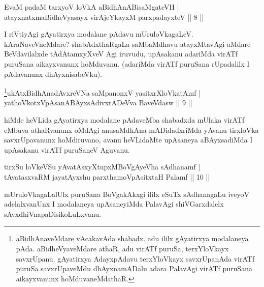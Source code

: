 \begin{shl}
EvaM padaM tarxyoV loVkA aBidhAnABisaMgateVH | \\
atayxnatxmaBidheVyasayx virAjeYkayxM parxpadayxteV \hfill ||  8 || 
\end{shl}

\begin{artha} 
I riVtiyAgi gAyatirxya modalane pAdavu mUruloVkagaLeV. 
kAraNaveVneMdare? shabAdxthaRgaLa saMbaMdhavu atayxMtavAgi aMdare 
BeVdavilalxde tAdAtamxyXveV Agi iruvudu, upAsakanu adariMda virATf 
puruSana aikayxvanunx hoMduvanu. (adariMda virATf puruSana rUpadalilx 
I pAdavanunx dhAyxnisabeVku).
\end{artha}


\begin{shl}
\footnote{aBidhAnaveMdare vAcakavAda shabadx. adu ililx gAyatirxya 
modalaneya pAda. aBidheVyaveMdare athaR, adu virATf puruSa, 
terxYloVkayx savxrUpanu. gAyatirxya AdayxpAdavu terxYloVkayx 
savxrUpanAda virATf puruSa savxrUpaveMdu dhAyxnamADalu adara PalavAgi 
virATf puruSana aikayxvanunx hoMduvaneMdathaR.}ukAtxBidhAnadAvxreVNa saMpanonxV yasitxrXloVkatAmf | \\
yathoVkotxVpAsanABAyxsAdivxrADeVva BaveVdasw \hfill ||  9 || 
\end{shl}

\begin{artha} 
hiMde heVLida gAyatirxya modalane pAdaveMba shabadxda mUlaka virATf 
eMbuva athaRvanunx oMdAgi anusaMdhAna mADidadxriMda yAvanu tirxloVka 
savxrUpavanunx hoMdiruvano, avanu heVLidaMte upAsaneya aBAyxsadiMda I 
upAsakanu virATf puruSaneV Aguvanu.
\end{artha}


\begin{shl}
tirxSu loVkeVSu yAvatAsxyXtupxMBoVgAyeVha sAdhanamf  | \\
tAvatasxvaRM jayatAyxshu parxthamoVpAsitxtaH Palamf \hfill ||  10 ||
\end{shl}

\begin{artha} 
mUruloVkagaLalUlx puruSana BoVgakAkxgi ililx eSuTx sAdhanagaLu iveyoV 
adelalxvanUnx I modalaneya upAsaneyiMda PalavAgi shiVGarxdalelx 
sAvxdhiVnapaDisikoLuLxvanu.
\end{artha}


